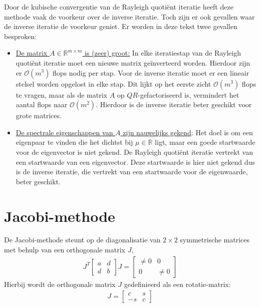 \documentclass[a4paper, 12pt, titlepage, fleqn]{article}
\begin{document}
Door de kubische convergentie van de Rayleigh quoti\"ent iteratie heeft deze methode vaak de voorkeur over de inverse iteratie. Toch zijn er ook gevallen waar de inverse iteratie de voorkeur geniet. Er worden in deze tekst twee gevallen besproken:
\begin{itemize}
\item \underline{De matrix $A \in \mathbb{R}^{m\times m}$ is (zeer) groot:} In elke iteratiestap van de Rayleigh quoti\"ent iteratie moet een nieuwe matrix ge\"inverteerd worden. Hierdoor zijn er $\mathcal{O}(m^3)$ flops nodig per stap. Voor de inverse iteratie moet er een lineair stelsel worden opgelost in elke stap. Dit lijkt op het eerste zicht $\mathcal{O}(m^3)$ flops te vragen, maar als de matrix $A$ op $QR$-gefactoriseerd is, vermindert het aantal flops naar $\mathcal{O}(m^2)$. Hierdoor is de inverse iteratie beter geschikt voor grote matrices.
\item \underline{De spectrale eigenschappen van $A$ zijn nauwelijks gekend}: Het doel is om een eigenpaar te vinden die het dichtst bij $\mu \in \mathbb{R}$ ligt, maar een goede startwaarde voor de eigenvector is niet gekend. De Rayleigh quoti\"ent iteratie vertrekt van een startwaarde van een eigenvector. Deze startwaarde is hier niet gekend dus is de inverse iteratie, die vertrekt van een startwaarde voor de eigenwaarde, beter geschikt.
\end{itemize}

\section{Jacobi-methode}\label{sec: jacobi}
De Jacobi-methode steunt op de diagonalisatie van $2 \times 2$ symmetrische matrices met behulp van een orthogonale matrix $J$,
\begin{align}\label{eq:jacobi}
J^T\left[\begin{matrix}
a &d\\
d &b
\end{matrix}\right]J = \left[ \begin{matrix}
\neq 0 &0\\
0 &\neq 0
\end{matrix}\right]
\end{align}
Hierbij wordt de orthogonale matrix $J$ gedefinieerd als een rotatie-matrix:
\begin{align}\label{eq:cs}
J  = \left[\begin{matrix}
c &s\\
-s &c
\end{matrix}\right]
\end{align}
\end{document}
